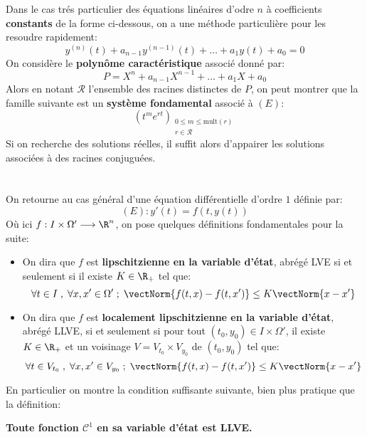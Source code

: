\subsection*{}
Dans le cas trés particulier des équations linéaires d'odre \( n \) à coefficients \textbf{constants} de la forme ci-dessous, on a une méthode particulière pour les resoudre rapidement:
\[ 
   y^{(n)}(t) + a_{n-1}y^{(n-1)}(t) + \ldots +  a_1y(t) + a_0  = 0
\]
On considère le \textbf{polynôme caractéristique} associé donné par:
\[ 
   P = X^n + a_{n-1}X^{n-1} + \ldots + a_1X + a_0
\]
Alors en notant \( \mathcal{R} \) l'ensemble des racines distinctes de \( P \), on peut montrer que la famille suivante est un \textbf{système fondamental} associé à \( (E) \):
\[ 
   (t^me^{rt})_{\substack{0 \leq m \leq \text{mult}(r)\\r \in \mathcal{R}}}
\]
Si on recherche des solutions réelles, il suffit alors d'appairer les solutions associées à des racines conjuguées.
\chapter*{}
On retourne au cas général d'une équation différentielle d'ordre \( 1 \) définie par:
\[ 
   (E): y'(t) = f(t, y(t)) 
\]
Où ici \( f : I \times \Omega' \longrightarrow \R^n \), on pose quelques définitions fondamentales pour la suite:
\begin{itemize}
   \item On dira que \( f \) est \textbf{lipschitzienne en la variable d'état}, abrégé LVE si et seulement si il existe \( K \in \R_+ \) tel que:
   \[ 
      \forall t \in I \; , \; \forall x, x' \in \Omega' \; ; \; \vectNorm{f(t, x) - f(t, x')} \leq K \vectNorm{x - x'} 
   \]
   \item On dira que \( f \) est \textbf{localement lipschitzienne en la variable d'état}, abrégé LLVE, si et seulement si pour tout \( (t_0, y_0) \in I \times \Omega' \), il existe \( K \in \R_+ \) et un voisinage \(V = V_{t_0} \times V_{y_0}\) de \((t_0, y_0)\) tel que:
   \[ 
      \forall t \in V_{t_0} \; , \; \forall x, x' \in V_{y_0} \; ; \; \vectNorm{f(t, x) - f(t, x')} \leq K \vectNorm{x - x'} 
   \]
\end{itemize} 
En particulier on montre la condition suffisante suivante, bien plus pratique que la définition:
\begin{center}
   \textbf{Toute fonction \( \mathcal{C}^1 \) en sa variable d'état est LLVE.}
\end{center}
